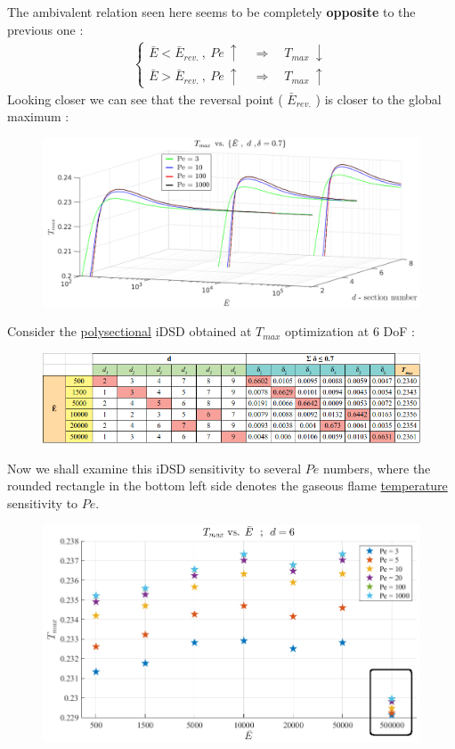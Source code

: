 \documentclass[12pt]{article}
\numberwithin{equation}{section}
\begin{document}
\begin{flushleft}
The ambivalent relation seen here seems to be completely \textbf{opposite} to the previous one :
\begin{align*}
\begin{cases}
\bar{E} < \bar{E}_{rev.} \ , \ Pe \ \uparrow \quad \Rightarrow \quad T_{max} \ \downarrow \\
\bar{E} > \bar{E}_{rev.} \ , \ Pe \ \uparrow \quad \Rightarrow \quad T_{max} \ \uparrow
\end{cases} 
\end{align*}
Looking closer we can see that the reversal point ( $\bar{E}_{rev.}$ ) is closer to the global maximum :
\begin{figure}[H]
\centering
\includegraphics[width=1.035 \linewidth, center]{T_max_space_high.png}
\end{figure}

Consider the \underline{polysectional} iDSD obtained at \hyperref[T_d_6]{$T_{max}$} optimization at 6 DoF :
\begin{figure}[H]
\centering
\includegraphics[width=1.1 \linewidth, center]{T_d_07_c.png}
\end{figure}
Now we shall examine this iDSD sensitivity to several $Pe$ numbers, where the rounded rectangle in the bottom left side denotes the gaseous flame \underline{temperature} sensitivity to $Pe$.
\begin{figure}[H]
\centering
\includegraphics[width=1.0 \linewidth, center]{T_max_Pe_1.png}
\end{figure}


\end{flushleft}
\end{document}
